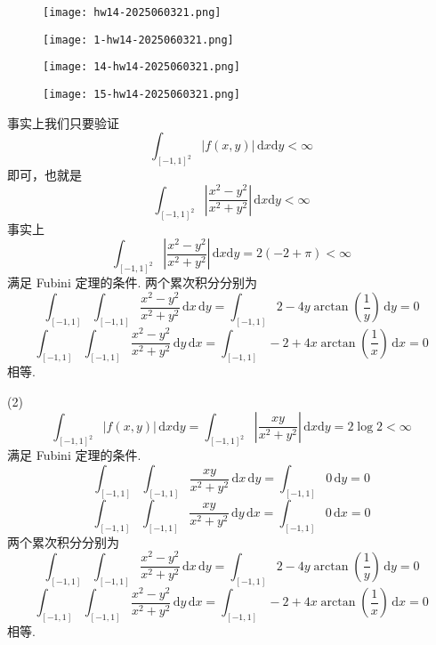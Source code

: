 \begin{exercise}
\begin{figure}[H]
\centering
\texttt{[image: hw14-2025060321.png]}
\label{}
\end{figure}
\begin{figure}[H]
\centering
\texttt{[image: 1-hw14-2025060321.png]}
\label{}
\end{figure}
\end{exercise}
\begin{figure}[H]
\centering
\texttt{[image: 14-hw14-2025060321.png]}
\label{}
\end{figure}
\begin{figure}[H]
\centering
\texttt{[image: 15-hw14-2025060321.png]}
\label{}
\end{figure}
事实上我们只要验证
\[
\int_{[-1,1]^2}^{} \lvert f(x,y) \rvert  \, \mathrm{d}x\mathrm{d}y<\infty
\]
即可，也就是
\[
\int_{[-1,1]^2}^{} \left\lvert  \frac{x^2-y^2}{x^2+y^2}  \right\rvert  \, \mathrm{d}x \mathrm{d}y<\infty
\]
事实上
\[
\int_{[-1,1]^2}^{} \left\lvert  \frac{x^2-y^2}{x^2+y^2}  \right\rvert  \, \mathrm{d}x \mathrm{d}y=2 (-2 + \pi)<\infty
\]
满足 Fubini 定理的条件. 两个累次积分分别为
\[
\int_{[-1,1]}^{} \int_{[-1,1]}^{} \frac{x^2-y^2}{x^2+y^2} \, \mathrm{d}x  \, \mathrm{d}y =\int_{[-1,1]}^{} 2-4y\arctan\left( \frac{1}{y} \right) \, \mathrm{d}y=0 
\]
\[
\int_{[-1,1]}^{} \int_{[-1,1]}^{} \frac{x^2-y^2}{x^2+y^2} \, \mathrm{d}y  \, \mathrm{d}x =\int_{[-1,1]}^{} -2+4x\arctan\left( \frac{1}{x} \right) \, \mathrm{d}x =0
\]
相等.

(2)
\[
\int_{[-1,1]^2}^{} \lvert f(x,y) \rvert  \, \mathrm{d}x \mathrm{d}y=\int_{[-1,1]^2}^{}\left\lvert   \frac{xy}{x^2+y^2}  \right\rvert  \, \mathrm{d}x \mathrm{d}y=2\log2<\infty
\]
满足 Fubini 定理的条件.
\[
\int_{[-1,1]}^{} \int_{[-1,1]}^{} \frac{xy}{x^2+y^2} \, \mathrm{d}x  \, \mathrm{d}y =\int_{[-1,1]}^{} 0 \, \mathrm{d}y =0
\]
\[
\int_{[-1,1]}^{} \int_{[-1,1]}^{} \frac{xy}{x^2+y^2} \, \mathrm{d}y  \, \mathrm{d}x =\int_{[-1,1]}^{} 0 \, \mathrm{d}x =0
\]
两个累次积分分别为
\[
\int_{[-1,1]}^{} \int_{[-1,1]}^{} \frac{x^2-y^2}{x^2+y^2} \, \mathrm{d}x  \, \mathrm{d}y =\int_{[-1,1]}^{} 2-4y\arctan\left( \frac{1}{y} \right) \, \mathrm{d}y=0 
\]
\[
\int_{[-1,1]}^{} \int_{[-1,1]}^{} \frac{x^2-y^2}{x^2+y^2} \, \mathrm{d}y  \, \mathrm{d}x =\int_{[-1,1]}^{} -2+4x\arctan\left( \frac{1}{x} \right) \, \mathrm{d}x =0
\]
相等.


